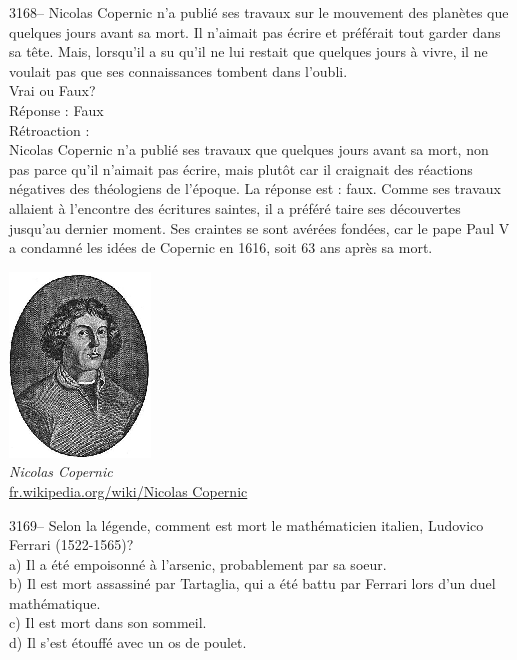 \documentclass[letterpaper, 12pt]{article}
\begin{document}
3168-- Nicolas Copernic n'a publi\'e ses travaux sur le mouvement des plan\`etes que quelques jours avant sa mort. Il n'aimait pas \'ecrire et pr\'ef\'erait tout garder dans sa t\^ete. Mais, lorsqu'il a su qu'il ne lui restait que quelques jours \`a vivre, il ne voulait pas que ses connaissances tombent dans l'oubli.\\
Vrai ou Faux?\\

R\'eponse : Faux\\

R\'etroaction :\\
Nicolas Copernic n'a publi\'e ses travaux que quelques jours avant sa mort, non pas parce qu'il n'aimait pas \'ecrire, mais plut\^ot car il craignait des r\'eactions n\'egatives des th\'eologiens de l'\'epoque. La r\'eponse est : faux. Comme ses travaux allaient \`a l'encontre des \'ecritures saintes, il a pr\'ef\'er\'e taire ses d\'ecouvertes jusqu'au dernier moment. Ses craintes se sont av\'er\'ees fond\'ees, car le pape Paul V a condamn\'e les id\'ees de Copernic en 1616, soit 63 ans apr\`es sa mort.
\begin{center}
\includegraphics[scale=1.3]{copernic.eps}\\
\emph{{\small Nicolas Copernic}}\\
\href{http://fr.wikipedia.org/wiki/Nicolas_Copernic}{fr.wikipedia.org/wiki/Nicolas Copernic}\\[5mm]
\end{center}



3169-- Selon la l\'egende, comment est mort le math\'ematicien italien, Ludovico Ferrari (1522-1565)?\\

a) Il a \'et\'e empoisonn\'e \`a l'arsenic, probablement par sa soeur.\\
b) Il est mort assassin\'e par Tartaglia, qui a \'et\'e battu par Ferrari lors d'un duel math\'ematique.\\
c) Il est mort dans son sommeil.\\
d) Il s'est \'etouff\'e avec un os de poulet.\\
\end{document}
